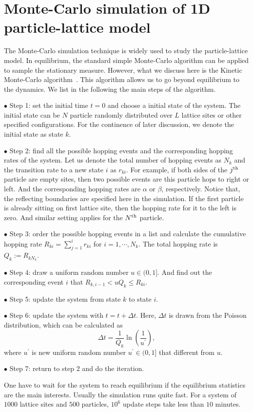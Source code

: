 
\chapter{Monte-Carlo simulation of 1D particle-lattice model}
\label{append:mc1D}


The Monte-Carlo simulation technique is widely used to study the particle-lattice model. In equilibrium, the standard simple Monte-Carlo algorithm can be applied to sample the stationary measure. However, what we discuss here is the Kinetic Monte-Carlo algorithm~\cite{Gillespie1976}. This algorithm allows us to go beyond equilibrium to the dynamics. We list in the following the main steps of the algorithm.

$\bullet$ Step 1: set the initial time $t=0$ and choose a initial state of the system. The initial state can be $N$ particle randomly distributed over $L$ lattice sites or other specified configurations. For the continence of later discussion, we denote the initial state as state $k$.

$\bullet$ Step 2: find all the possible hopping events and the corresponding hopping rates of the system. Let us denote the total number of hopping events as $N_k$ and the transition rate to a new state $i$ as $r_{ki}$. For example, if both sides of the $j^{\rm{th}}$ particle are empty sites, then two possible events are this particle hops to right or left. And the corresponding hopping rates are $\alpha$ or $\beta$, respectively. Notice that, the reflecting boundaries are specified here in the simulation. If the first particle is already sitting on first lattice site, then the hopping rate for it to the left is zero. And similar setting applies for the $N^{\rm{th}}$ particle. 

$\bullet$ Step 3: order the possible hopping events in a list and calculate the cumulative hopping rate $R_{ki} = \sum_{j=1}^i r_{ki}$ for $i=1, \cdots, N_k$. The total hopping rate is $Q_k := R_{kN_k}$.

$\bullet$ Step 4: draw a uniform random number $u\in(0,1]$. And find out the corresponding event $i$ that $R_{k,i-1} < uQ_k \leqslant R_{ki}$.

$\bullet$ Step 5: update the system from state $k$ to state $i$. 

$\bullet$ Step 6: update the system with $t = t + \Delta t$. Here, $\Delta t$ is drawn from the Poisson distribution, which can be calculated as 
\begin{equation}
    \Delta t = \frac{1}{Q_k} \ln\left(\frac{1}{u^{\prime}}\right),
\end{equation}
where $u^{\prime}$ is new uniform random number $u^{\prime}\in(0,1]$ that different from $u$. 

$\bullet$ Step 7: return to step 2 and do the iteration.

One have to wait for the system to reach equilibrium if the equilibrium statistics are the main interests. Usually the simulation runs quite fast. For a system of $1000$ lattice sites and $500$ particles, $10^6$ update steps take less than $10$ minutes.
